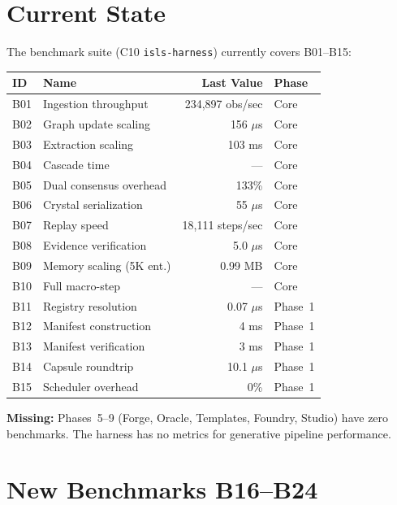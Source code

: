 \documentclass[11pt,a4paper,twoside]{article}
\theoremstyle{definition}
\theoremstyle{plain}
\theoremstyle{remark}
\begin{document}
\section{Current State}\label{sec:benchstate}

The benchmark suite (C10 \texttt{isls-harness}) currently covers
B01--B15:

\begin{tabularx}{\textwidth}{l l r l}
\toprule
\textbf{ID} & \textbf{Name} & \textbf{Last Value} & \textbf{Phase} \\
\midrule
B01 & Ingestion throughput & 234,897 obs/sec & Core \\
B02 & Graph update scaling & 156 $\mu$s & Core \\
B03 & Extraction scaling & 103 ms & Core \\
B04 & Cascade time & --- & Core \\
B05 & Dual consensus overhead & 133\% & Core \\
B06 & Crystal serialization & 55 $\mu$s & Core \\
B07 & Replay speed & 18,111 steps/sec & Core \\
B08 & Evidence verification & 5.0 $\mu$s & Core \\
B09 & Memory scaling (5K ent.) & 0.99 MB & Core \\
B10 & Full macro-step & --- & Core \\
B11 & Registry resolution & 0.07 $\mu$s & Phase~1 \\
B12 & Manifest construction & 4 ms & Phase~1 \\
B13 & Manifest verification & 3 ms & Phase~1 \\
B14 & Capsule roundtrip & 10.1 $\mu$s & Phase~1 \\
B15 & Scheduler overhead & 0\% & Phase~1 \\
\bottomrule
\end{tabularx}

\textbf{Missing:} Phases~5--9 (Forge, Oracle, Templates, Foundry,
Studio) have zero benchmarks. The harness has no metrics for
generative pipeline performance.


\section{New Benchmarks B16--B24}\label{sec:newbench}
\end{document}
